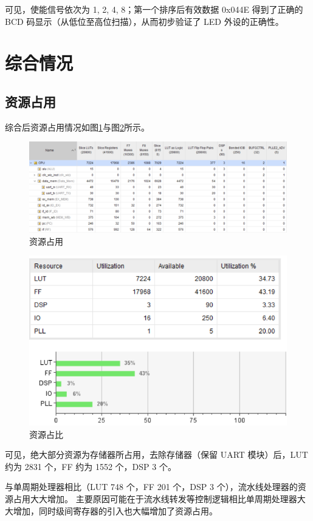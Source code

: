 \documentclass[a4paper]{article}  %
\begin{document}
可见，使能信号依次为 1, 2, 4, 8；第一个排序后有效数据 0x044E 得到了正确的 BCD 码显示（从低位至高位扫描），从而初步验证了 LED 外设的正确性。

\section{综合情况}

\subsection{资源占用}

综合后资源占用情况如图\ref{fig:utilization_hierarchy}与图\ref{fig:utilization_summary}所示。

\begin{figure}[ht]
    \centering
    \includegraphics[width=.9\textwidth]{asserts/utilization_hierarchy.png}
    \caption{
        资源占用
    }\label{fig:utilization_hierarchy}
\end{figure}

\begin{figure}[ht]
    \centering
    \includegraphics[width=.6\textwidth]{asserts/utilization_summary.png}
    \caption{
        资源占比
    }\label{fig:utilization_summary}
\end{figure}

可见，绝大部分资源为存储器所占用，去除存储器（保留 UART 模块）后，LUT 约为 2831 个，FF 约为 1552 个，DSP 3 个。

与单周期处理器相比（LUT 748 个，FF 201 个，DSP 3 个），流水线处理器的资源占用大大增加。
主要原因可能在于流水线转发等控制逻辑相比单周期处理器大大增加，同时级间寄存器的引入也大幅增加了资源占用。
\end{document}
